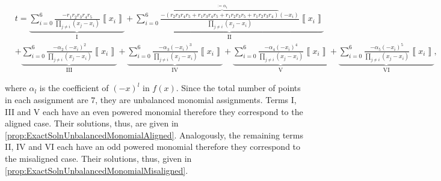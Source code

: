\documentclass{article}
\begin{document}
\begin{small}
  \begin{align*}
     & t  =\underbrace{\sum_{i=0}^{6}\frac{-r_{1}r_{2}r_{3}r_{4}r_{5}}{\prod_{j\neq i}(x_{j}-x_{i})}\left\llbracket x_{i}\right\rrbracket }_{\text{I}}+\underbrace{\sum_{i=0}^{6}\frac{-\overbrace{(r_{2}r_{3}r_{4}r_{5}+r_{1}r_{3}r_{4}r_{5}+r_{1}r_{2}r_{3}r_{5}+r_{1}r_{2}r_{3}r_{4})}^{:=\alpha_{1}}(-x_{i})}{\prod_{j\neq i}(x_{j}-x_{i})}\left\llbracket x_{i}\right\rrbracket }_{\text{II}}                                                                                                                                                                               \\
     & +\underbrace{\sum_{i=0}^{6}\frac{-\alpha_{2}(-x_{i})^{2}}{\prod_{j\neq i}(x_{j}-x_{i})}\left\llbracket x_{i}\right\rrbracket }_{\text{III}}+\underbrace{\sum_{i=0}^{6}\frac{-\alpha_{3}(-x_{i})^{3}}{\prod_{j\neq i}(x_{j}-x_{i})}\left\llbracket x_{i}\right\rrbracket }_{\text{IV}}+\underbrace{\sum_{i=0}^{6}\frac{-\alpha_{4}(-x_{i})^{4}}{\prod_{j\neq i}(x_{j}-x_{i})}\left\llbracket x_{i}\right\rrbracket }_{\text{V}}+\underbrace{\sum_{i=0}^{6}\frac{-\alpha_{5}(-x_{i})^{5}}{\prod_{j\neq i}(x_{j}-x_{i})}\left\llbracket x_{i}\right\rrbracket }_{\text{VI}},
  \end{align*}
\end{small}where $\alpha_{l}$ is the coefficient of $(-x)^{l}$ in $f(x)$.
Since the total number of points in each assignment are $7$, they
are unbalanced monomial assignments. Terms I, III and V each have
an even powered monomial therefore they correspond to the aligned
case. Their solutions, thus, are given in \cref{prop:ExactSolnUnbalancedMonomialAligned}.
Analogously, the remaining terms II, IV and VI each have an odd powered
monomial therefore they correspond to the misaligned case. Their solutions,
thus, given in \cref{prop:ExactSolnUnbalancedMonomialMisaligned}.
\end{document}
